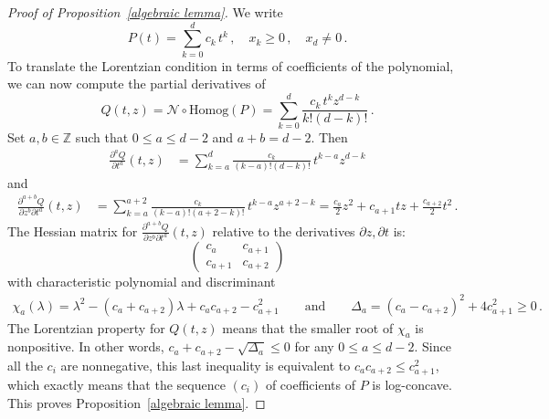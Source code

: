 \documentclass[12pt,reqno]{amsart}
\theoremstyle{definition}
\def\normal{\mathcal{N}}
\begin{document}
\begin{proof}[Proof of Proposition~\ref{algebraic lemma}]
We write 
$$
P(t) = \sum\limits_{k = 0}^{d} c_k\, t^k \,, \quad x_k \geq 0 \,, \quad x_d \neq 0 \,.
$$ 
To translate the Lorentzian condition in terms of coefficients of the polynomial, we can now compute the partial derivatives of $$Q(t,z) = \normal\circ\mathrm{Homog}(P) = \sum\limits_{k = 0}^{d} \frac{c_k\, t^k z^{d-k}}{k!(d-k)!}  \, .$$
Set $a,b \in \mathbb{Z}$ such that $0 \leq a \leq d-2$ and $a + b = d-2$. Then
\begin{align*}
 \frac{\partial^a Q}{\partial t^a} (t,z)   %
  & =  \sum\limits_{k = a}^{d} \frac{c_k}{(k-a)!(d-k)!} \, t^{k-a} z^{d-k}  
\end{align*}
and
\begin{align*}
 \frac{\partial^{a+b} Q}{\partial z^b \partial t^a} (t,z)   %
  & =  \sum\limits_{k = a}^{a+2} \frac{c_k}{(k-a)!(a+2-k)!} \, t^{k-a} z^{a+2-k}
  = \frac{c_a}{2} z^2 + c_{a+1} t z + \frac{c_{a+2}}{2} t^2 \,.
\end{align*}
The Hessian matrix for $\frac{\partial^{a+b} Q}{\partial z^b \partial t^a} (t,z)$ relative to the derivatives $\partial z, \partial t$ is:
\[
\begin{pmatrix}
    c_a                          & c_{a+1} \\
 c_{a+1}                      & c_{a+2}
\end{pmatrix}
\]
with characteristic polynomial and discriminant
\begin{align*}
 \chi_a(\lambda)   %
   =  \lambda^2 - (c_a + c_{a+2}) \lambda + c_a c_{a+2} - c_{a+1}^2 
   \qquad 
   \mbox{and}
   \qquad 
   \Delta_a = (c_a - c_{a+2})^2 + 4 c_{a+1}^2 \geq 0 \,.
\end{align*}
The Lorentzian property for $Q(t,z)$ means that the smaller root of $\chi_a$ is nonpositive. In other words, $c_a + c_{a+2} - \sqrt{\Delta_a} \leq 0$ for any $0 \leq a \leq d-2$. Since all the $c_i$ are nonnegative, this last inequality is equivalent to $c_a c_{a+2} \leq c_{a+1}^2$, which exactly means that the sequence $(c_i)$ of coefficients of $P$ is log-concave. This proves Proposition~\ref{algebraic lemma}.
\end{proof}
\end{document}
